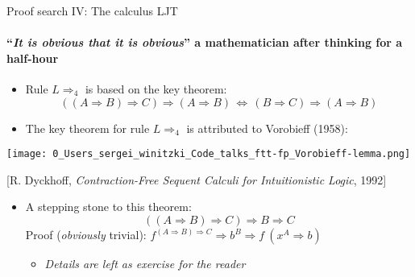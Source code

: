 \documentclass[english]{beamer}
\begin{document}
\begin{frame}{Proof search IV: The calculus LJT}


\framesubtitle{``\emph{It is obvious that it is obvious}'' \textendash{} a mathematician
after thinking for a half-hour}
\begin{itemize}
\item Rule $L\Rightarrow_{4}$ is based on the key theorem: {\footnotesize{}
\[
\left(\left(A\Rightarrow B\right)\Rightarrow C\right)\Rightarrow\left(A\Rightarrow B\right)\,\Longleftrightarrow\,\left(B\Rightarrow C\right)\Rightarrow\left(A\Rightarrow B\right)
\]
}{\footnotesize \par}
\item The key theorem for rule $L\Rightarrow_{4}$ is attributed to Vorobieff
(1958):
\end{itemize}
\begin{center}
\texttt{[image: 0\_Users\_sergei\_winitzki\_Code\_talks\_ftt-fp\_Vorobieff-lemma.png]}
\par\end{center}

\begin{center}
{\footnotesize{}{[}R. Dyckhoff, }\emph{\footnotesize{}Contraction-Free
Sequent Calculi for Intuitionistic Logic}{\footnotesize{}, 1992{]}}
\par\end{center}{\footnotesize \par}
\begin{itemize}
\item A stepping stone to this theorem:{\footnotesize{}
\[
\left(\left(A\Rightarrow B\right)\Rightarrow C\right)\Rightarrow B\Rightarrow C
\]
}Proof (\emph{obviously} trivial): $f^{\left(A\Rightarrow B\right)\Rightarrow C}\Rightarrow b^{B}\Rightarrow f\:(x^{A}\Rightarrow b)$
\begin{itemize}
\item \emph{Details are left as exercise for the reader}
\end{itemize}
\end{itemize}
\end{frame}
\end{document}
